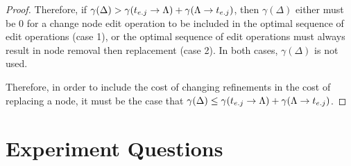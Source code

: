 \begin{proof}
    Therefore, if $\gamma(\Delta) > \gamma(t_{{e}.{j}} \rightarrow {\Lambda}) + \gamma(\Lambda \rightarrow {t_{{e}.{j}}})$, then $\gamma(\Delta)$ either must be 0 for a change node edit operation to be included in the optimal sequence of edit operations (case 1), or the optimal sequence of edit operations must always result in node removal then replacement (case 2). In both cases, $\gamma(\Delta)$ is not used.

    Therefore, in order to include the cost of changing refinements in the cost of replacing a node, it must be the case that $\gamma(\Delta) \le \gamma(t_{{e}.{j}} \rightarrow {\Lambda}) + \gamma(\Lambda \rightarrow {t_{{e}.{j}}})$.


\end{proof}



























\section{Experiment Questions}
\label{app:exp-questions}





